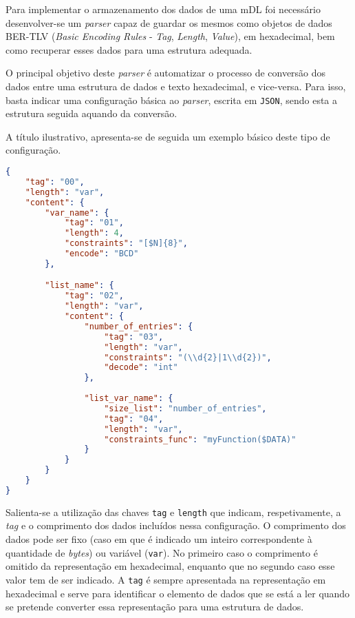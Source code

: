 Para implementar o armazenamento dos dados de uma mDL foi necessário desenvolver-se um \textit{parser} capaz de guardar os mesmos como objetos de dados BER-TLV (\textit{Basic Encoding
Rules} - \textit{Tag}, \textit{Length}, \textit{Value}), em hexadecimal, bem como recuperar esses dados para uma estrutura adequada. 

O principal objetivo deste \textit{parser} é automatizar o processo de conversão dos dados entre uma estrutura de dados e texto hexadecimal, e vice-versa. Para isso, basta indicar uma configuração básica ao \textit{parser}, escrita em \texttt{JSON}, sendo esta a estrutura seguida aquando da conversão.

A título ilustrativo, apresenta-se de seguida um exemplo básico deste tipo de configuração.

\begin{lstlisting}[language=json]
{
    "tag": "00",
    "length": "var",
    "content": {
        "var_name": {
            "tag": "01",
            "length": 4,
            "constraints": "[$N]{8}",
            "encode": "BCD"
        },

        "list_name": {
            "tag": "02",
            "length": "var",
            "content": {
                "number_of_entries": {
                    "tag": "03",
                    "length": "var",
                    "constraints": "(\\d{2}|1\\d{2})",
                    "decode": "int"
                },
                
                "list_var_name": {
                    "size_list": "number_of_entries",
                    "tag": "04",
                    "length": "var",
                    "constraints_func": "myFunction($DATA)"
                }
            }
        }
    }
}
\end{lstlisting}

\vspace{0.5cm}

Salienta-se a utilização das chaves \texttt{tag} e \texttt{length} que indicam, respetivamente, a \textit{tag} e o comprimento dos dados incluídos nessa configuração. O comprimento dos dados pode ser fixo (caso em que é indicado um inteiro correspondente à quantidade de \textit{bytes}) ou variável (\texttt{var}). No primeiro caso o comprimento é omitido da representação em hexadecimal, enquanto que no segundo caso esse valor tem de ser indicado. A \texttt{tag} é sempre apresentada na representação em hexadecimal e serve para identificar o elemento de dados que se está a ler quando se pretende converter essa representação para uma estrutura de dados.

